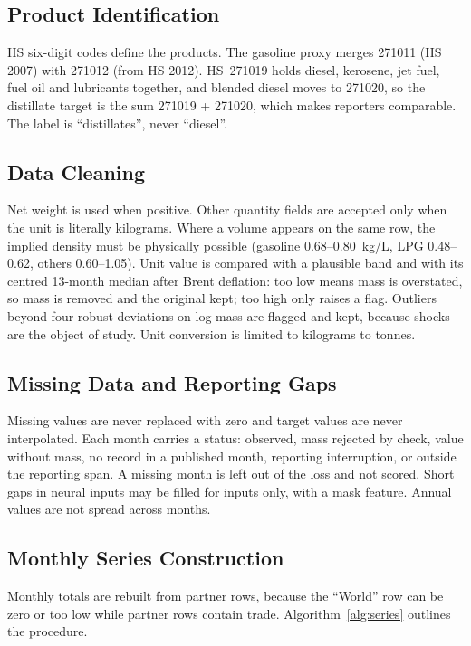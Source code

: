 \documentclass[conference]{IEEEtran}
\begin{document}
\subsection{Product Identification}
HS six-digit codes define the products. The gasoline proxy merges 271011 (HS 2007) with 271012 (from HS 2012). HS~271019 holds diesel, kerosene, jet fuel, fuel oil and lubricants together, and blended diesel moves to 271020, so the distillate target is the sum 271019 + 271020, which makes reporters comparable. The label is ``distillates'', never ``diesel''.

\subsection{Data Cleaning}
Net weight is used when positive. Other quantity fields are accepted only when the unit is literally kilograms. Where a volume appears on the same row, the implied density must be physically possible (gasoline 0.68--0.80~kg/L, LPG 0.48--0.62, others 0.60--1.05). Unit value is compared with a plausible band and with its centred 13-month median after Brent deflation: too low means mass is overstated, so mass is removed and the original kept; too high only raises a flag. Outliers beyond four robust deviations on log mass are flagged and kept, because shocks are the object of study. Unit conversion is limited to kilograms to tonnes.

\subsection{Missing Data and Reporting Gaps}
Missing values are never replaced with zero and target values are never interpolated. Each month carries a status: observed, mass rejected by check, value without mass, no record in a published month, reporting interruption, or outside the reporting span. A missing month is left out of the loss and not scored. Short gaps in neural inputs may be filled for inputs only, with a mask feature. Annual values are not spread across months.

\subsection{Monthly Series Construction}
Monthly totals are rebuilt from partner rows, because the ``World'' row can be zero or too low while partner rows contain trade. Algorithm~\ref{alg:series} outlines the procedure.
\end{document}
